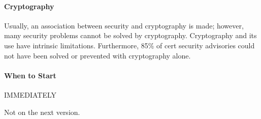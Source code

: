 \paragraph{Cryptography} 
Usually, an association between security and cryptography is made; however, many security problems cannot be solved by cryptography. Cryptography and its use have intrinsic limitations. Furthermore, 85\% of \gls{cert} security advisories could not have been solved or prevented with cryptography alone.

\paragraph{When to Start}
\begin{center}
    IMMEDIATELY
\end{center}
Not on the next version.
